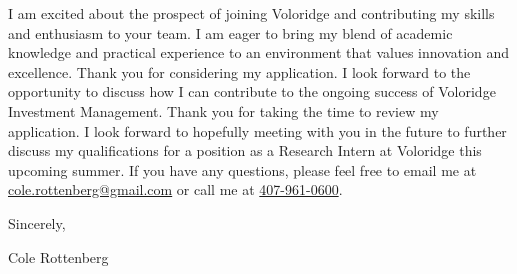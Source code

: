 \documentclass{ExpressiveCoverLetter}
\begin{document}
I am excited about the prospect of joining Voloridge and contributing my skills and enthusiasm to your team. I am eager to bring my blend of academic knowledge and practical experience to an environment that values innovation and excellence. Thank you for considering my application. I look forward to the opportunity to discuss how I can contribute to the ongoing success of Voloridge Investment Management.
Thank you for taking the time to review my application. I look forward
to hopefully meeting with you in the future to further discuss my
qualifications for a position as a Research Intern at Voloridge
this upcoming summer. If you have any questions, please feel free to
email me at \href{mailto:cole.rottenberg@gmail.com}{cole.rottenberg@gmail.com} or
call me at \href{tel:+1-407-961-0600}{407-961-0600}.

Sincerely,

\vspace{.15in}

Cole Rottenberg
\end{document}
